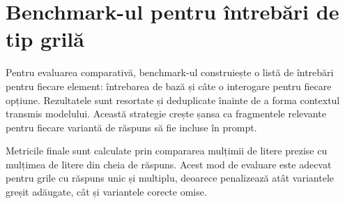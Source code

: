 \documentclass[12pt, a4paper, oneside, romanian]{teza-upb}
\begin{document}
\label{anexa:evaluator-retry}


\section{Benchmark-ul pentru întrebări de tip grilă}

Pentru evaluarea comparativă, benchmark-ul construiește o listă de întrebări pentru fiecare element: întrebarea de bază și câte o interogare pentru fiecare opțiune. Rezultatele sunt resortate și deduplicate înainte de a forma contextul transmis modelului. Această strategie crește șansa ca fragmentele relevante pentru fiecare variantă de răspuns să fie incluse în prompt.

\label{anexa:benchmark-reranking}


Metricile finale sunt calculate prin compararea mulțimii de litere prezise cu mulțimea de litere din cheia de răspuns. Acest mod de evaluare este adecvat pentru grile cu răspuns unic și multiplu, deoarece penalizează atât variantele greșit adăugate, cât și variantele corecte omise.

\label{anexa:benchmark-metrics}

\end{document}
